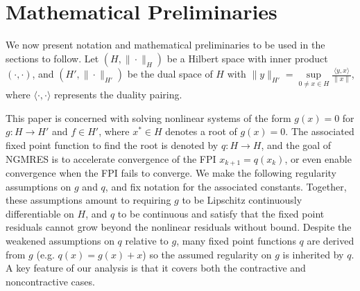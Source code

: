 \documentclass{article}
\numberwithin{equation}{section}
\begin{document}
\section{Mathematical Preliminaries}
We now present notation and mathematical preliminaries to be used in the sections to follow.  Let  $(H,\|\cdot \|_H)$ be a Hilbert space with inner product $(\cdot,\cdot)$, and $(H', \|\cdot \|_{H'})$ be the dual space of $H$ with $\displaystyle \|y\|_{H'} = \sup\limits_{0\neq x\in H} \frac{\langle y,x\rangle}{\|x\|}$, where $\langle \cdot,\cdot \rangle$ represents the duality pairing. 

This paper is concerned with solving nonlinear systems of the form $g(x)=0$ for $g:H\rightarrow H'$ and $f\in H'$, where $x^*\in H$ denotes a root of  $g(x)=0$.  The associated fixed point function to find the root is denoted by $q:H\rightarrow H$, and the goal of NGMRES is to accelerate convergence of the FPI $x_{k+1}=q(x_k)$, or even enable convergence when the FPI fails to converge.  We make the following regularity assumptions on $g$ and $q$, and fix notation for the associated constants.
Together, these assumptions amount to requiring $g$ to be Lipschitz continuously differentiable on $H$, and $q$ to be continuous and satisfy that the fixed point residuals cannot grow beyond the nonlinear residuals without bound.  Despite the weakened assumptions on $q$ relative to $g$,  many fixed point functions $q$ are derived from $g$ (e.g. $q(x)=g(x)+x$) so the assumed regularity on $g$ is  inherited by $q$.  
A key feature of our analysis is that it covers both the contractive and noncontractive cases.
\end{document}
